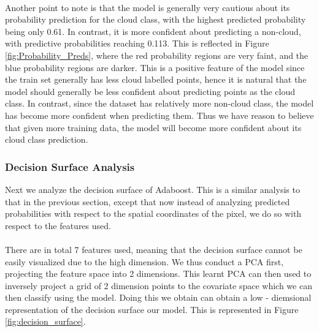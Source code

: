 \documentclass[11pt, letterpaper, journal]{IEEEtran}
\begin{document}
\\
Another point to note is that the model is generally very cautious about its probability prediction for the cloud class, with the highest predicted probability being only 0.61. In contrast, it is more confident about predicting a non-cloud, with predictive probabilities reaching 0.113. This is reflected in Figure \ref{fig:Probability_Preds}, where the red probability regions are very faint, and the blue probability regions are darker. This is a positive feature of the model since the train set generally has less cloud labelled points, hence it is natural that the model should generally be less confident about predicting points as the cloud class. In contrast, since the dataset has relatively more non-cloud class, the model has become more confident when predicting them. Thus we have reason to believe that given more training data, the model will become more confident about its cloud class prediction.

\subsubsection{Decision Surface Analysis}
Next we analyze the decision surface of Adaboost. This is a similar analysis to that in the previous section, except that now instead of analyzing predicted probabilities with respect to the spatial coordinates of the pixel, we do so with respect to the features used. 
\\
\\
There are in total 7 features used, meaning that the decision surface cannot be easily visualized due to the high dimension. We thus conduct a PCA first, projecting the feature space into 2 dimensions. This learnt PCA can then used to inversely project a grid of 2 dimension points to the covariate space which we can then classify using the model. Doing this we obtain can obtain a low - diemsional representation of the decision surface our model. This is represented in Figure \ref{fig:decision_surface}. \\
\end{document}
